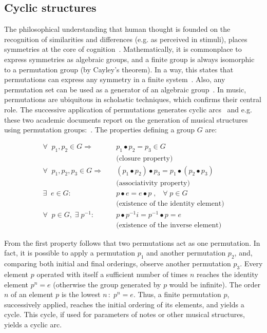 \subsection{Cyclic structures}\label{estCic}
The philosophical understanding that human thought is founded on the recognition of similarities and differences (e.g. as perceived in stimuli), places symmetries
at the core of cognition~\cite{Deleuze}.
Mathematically, it is commonplace to express symmetries as algebraic groups, and a finite group is always isomorphic to a permutation
group (by Cayley's theorem).
In a way, this states that permutations can express any symmetry in a
finite system~\cite{gruposFascination}.
Also, any permutation set can be used as a generator of an algebraic group~\cite{permMusic}.
In music, permutations are ubiquitous in scholastic techniques,
 which confirms their central role.
The successive application of permutations generates cyclic arcs~\cite{change,Zamacois,permMusic} and
e.g. these two academic documents report on the generation of musical structures using permutation groups:~\cite{figgusOriginal, figgusEspacializacao}.
The properties defining a group $G$ are:

\begin{equation}\label{eq:groups}
\begin{split}
\forall \;\; p_1,p_2 \in G \Rightarrow  \quad   & p_1 \bullet p_2  = p_3 \in G \\ 
     & \text{(closure property)} \\
\forall \;\; p_1,p_2,p_3 \in G \Rightarrow \quad & (p_1\bullet p_2)\bullet p_3  = p_1\bullet (p_2\bullet p_3) \\
     & \text{(associativity property)} \\
\exists \;\; e \in G :                  \quad    & p \bullet e  = e \bullet p \;,\;\;\; \forall\; p \in G  \\ 
     &  \text{(existence of the identity element)} \\
\forall \;\; p \in G, \;\exists\; p^{-1} :\quad  &  p\bullet p^{-1}i =p^{-1}\bullet p = e \\
     &  \text{(existence of the inverse element)}
\end{split}
\end{equation}

From the first property follows that two permutations act as one permutation. In fact, it is possible to apply a
permutation $p_1$ and another permutation $p_2$, and, comparing both initial and final orderings, observe another permutation $p_3$.
Every element $p$ operated with itself a sufficient number of times $n$ reaches the identity element $p^n=e$ (otherwise the group generated by $p$ would be infinite).
The order $n$ of an element $p$ is
the lowest $n\,:\;p^n=e$.
Thus, a finite
permutation $p$, successively applied, reaches the initial ordering of its
elements, and yields a cycle. This cycle, if used for parameters of notes or other musical structures,
yields a cyclic arc.

